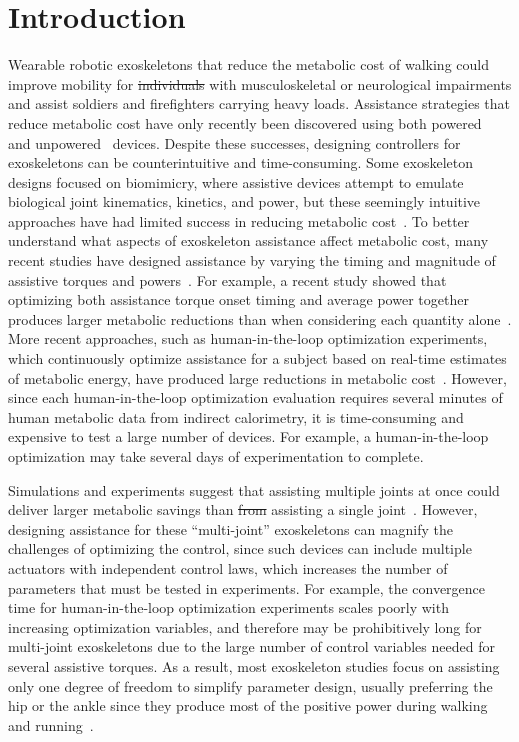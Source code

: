 \documentclass[10pt,letterpaper]{article}
\providecommand{\DIFaddtex}[1]{{\protect\color{blue}{#1}}} %
\providecommand{\DIFdeltex}[1]{{\protect\color{red}\sout{#1}}}                      %
\providecommand{\DIFaddbegin}{} %
\providecommand{\DIFaddend}{} %
\providecommand{\DIFdelbegin}{} %
\providecommand{\DIFdelend}{} %
\providecommand{\DIFadd}[1]{\texorpdfstring{\DIFaddtex{#1}}{#1}} %
\providecommand{\DIFdel}[1]{\texorpdfstring{\DIFdeltex{#1}}{}} %
\newcommand{\DIFscaledelfig}{0.5}
\newlength{\DIFdelgraphicswidth} %
\newlength{\DIFdelgraphicsheight} %
\newcommand{\DIFaddincludegraphics}[2][]{{\color{blue}\fbox{\DIFOincludegraphics[#1]{#2}}}} %
\newcommand{\DIFdelincludegraphics}[2][]{%
\sbox{\DIFdelgraphicsbox}{\DIFOincludegraphics[#1]{#2}}%
\settoboxwidth{\DIFdelgraphicswidth}{\DIFdelgraphicsbox} %
\settoboxtotalheight{\DIFdelgraphicsheight}{\DIFdelgraphicsbox} %
\scalebox{\DIFscaledelfig}{%
\parbox[b]{\DIFdelgraphicswidth}{\usebox{\DIFdelgraphicsbox}\\[-\baselineskip] \rule{\DIFdelgraphicswidth}{0em}}\llap{\resizebox{\DIFdelgraphicswidth}{\DIFdelgraphicsheight}{%
\setlength{\unitlength}{\DIFdelgraphicswidth}%
\begin{picture}(1,1)%
\thicklines\linethickness{2pt} %
{\color[rgb]{1,0,0}\put(0,0){\framebox(1,1){}}}%
{\color[rgb]{1,0,0}\put(0,0){\line( 1,1){1}}}%
{\color[rgb]{1,0,0}\put(0,1){\line(1,-1){1}}}%
\end{picture}%
}*{3pt}}} %
} %
\DeclareRobustCommand{\DIFaddbegin}{\DIFOaddbegin \let\includegraphics\DIFaddincludegraphics} %
\DeclareRobustCommand{\DIFaddend}{\DIFOaddend \let\includegraphics\DIFOincludegraphics} %
\DeclareRobustCommand{\DIFdelbegin}{\DIFOdelbegin \let\includegraphics\DIFdelincludegraphics} %
\DeclareRobustCommand{\DIFdelend}{\DIFOaddend \let\includegraphics\DIFOincludegraphics} %
\begin{document}
\section*{Introduction}
Wearable robotic exoskeletons that reduce the metabolic cost of walking could improve mobility for \DIFdelbegin \DIFdel{individuals }\DIFdelend \DIFaddbegin \DIFadd{many individuals including those }\DIFaddend with musculoskeletal or neurological impairments and assist soldiers and firefighters carrying heavy loads. Assistance strategies that reduce metabolic cost have only recently been discovered using both powered~\cite{Sawicki:2008, Malcolm:2013, Mooney:2014, Sawicki:2020} and unpowered~\cite{Collins:2015} devices. Despite these successes, designing controllers for exoskeletons can be counterintuitive and time-consuming. Some exoskeleton designs focused on biomimicry, where assistive devices attempt to emulate biological joint kinematics, kinetics, and power, but these seemingly intuitive approaches have had limited success in reducing metabolic cost~\cite{vanDijk:2011, Cornwall:2015}. To better understand what aspects of exoskeleton assistance affect metabolic cost, many recent studies have designed assistance by varying the timing and magnitude of assistive torques and powers~\cite{Zhang:2017, Ding:2016, Ding:2018, Galle:2017, Quinlivan:2017}. For example, a recent study showed that optimizing both assistance torque onset timing and average power together produces larger metabolic reductions than when considering each quantity alone~\cite{Galle:2017}. More recent approaches, such as human-in-the-loop optimization experiments, which continuously optimize assistance for a subject based on real-time estimates of metabolic energy, have produced large reductions in metabolic cost~\cite{Zhang:2017, Ding:2018}. However, since each human-in-the-loop optimization evaluation requires several minutes of human metabolic data from indirect calorimetry, it is time-consuming and expensive to test a large number of devices. For example, a human-in-the-loop optimization may take several days of experimentation to complete.

Simulations and experiments suggest that assisting multiple joints at once could deliver larger metabolic savings than \DIFdelbegin \DIFdel{from }\DIFdelend assisting a single joint~\cite{Uchida:2016, Quinlivan:2017, Malcolm:2018, Bryan:2020}. However, designing assistance for these ``multi-joint'' exoskeletons can magnify the challenges of optimizing the control, since such devices can include multiple actuators with independent control laws, which increases the number of parameters that must be tested in experiments. For example, the convergence time for human-in-the-loop optimization experiments scales poorly with increasing optimization variables, and therefore may be prohibitively long for multi-joint exoskeletons due to the large number of control variables needed for several assistive torques. As a result, most exoskeleton studies focus on assisting only one degree of freedom to simplify parameter design, usually preferring the hip or the ankle since they produce most of the positive power during walking and running~\cite{Winter:1991, Novacheck:1998, Farris:2012, Sawicki:2020}. 
\end{document}
